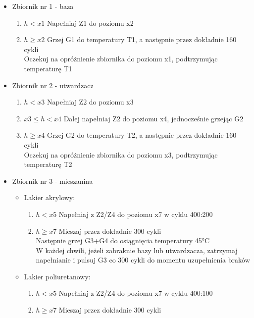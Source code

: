 \documentclass[12pt,oneside]{article}
\begin{document}
\begin{itemize}
    \item Zbiornik nr 1 - baza
    \begin{enumerate}
        \item $h < x1$ Napełniaj Z1 do poziomu x2
        \item $h \ge x2$ Grzej G1 do temperatury T1, a następnie przez dokładnie 160 cykli\\
        Oczekuj na opróżnienie zbiornika do poziomu x1, podtrzymując temperaturę T1
    \end{enumerate}
    \item Zbiornik nr 2 - utwardzacz
    \begin{enumerate}
        \item $h < x3$ Napełniaj Z2 do poziomu x3
        \item $x3 \leq h < x4$ Dalej napełniaj Z2 do poziomu x4, jednocześnie grzejąc G2
        \item $h \ge x4$ Grzej G2 do temperatury T2, a następnie przez dokładnie 160 cykli\\
        Oczekuj na opróżnienie zbiornika do poziomu x3, podtrzymując temperaturę T2
    \end{enumerate}
    \item Zbiornik nr 3 - mieszanina
        \begin{itemize}
            \item Lakier akrylowy:
                \begin{enumerate}
                \item $h < x5$ Napełniaj z Z2/Z4 do poziomu x7 w cyklu 400:200
                \item $h \ge x7$ Mieszaj przez dokładnie 300 cykli\\
                Następnie grzej G3+G4 do osiągnięcia temperatury 45°C\\
                W każdej chwili, jeżeli zabraknie bazy lub utwardzacza, zatrzymaj napełnianie i pulsuj G3 co 300 cykli do momentu uzupełnienia braków\\
                \end{enumerate}
            \item Lakier poliuretanowy:
                \begin{enumerate}
                \item $h < x5$ Napełniaj z Z2/Z4 do poziomu x7 w cyklu 400:100
                \item $h \ge x7$ Mieszaj przez dokładnie 300 cykli\\

\end{enumerate}
\end{itemize}
\end{itemize}
\end{document}
